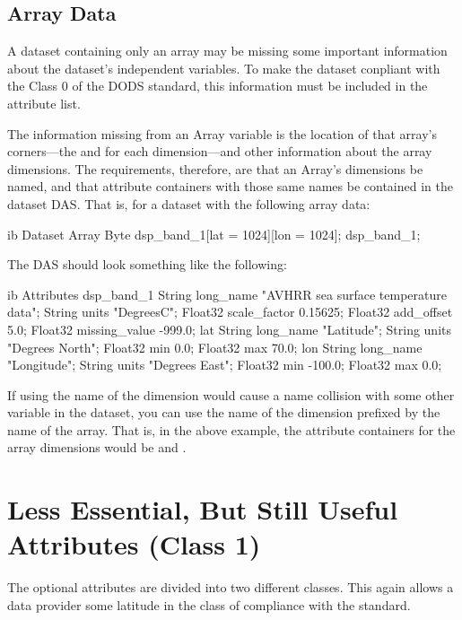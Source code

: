 \subsection{Array Data}

A dataset containing only an array may be missing some important
information about the dataset's independent variables.  To make the
dataset conpliant with the Class 0 of the DODS standard, this
information must be included in the attribute list.

The information missing from an Array variable is the location of that
array's corners---the  and  for each dimension---and
other information about the array dimensions.  The requirements,
therefore, are that an Array's dimensions be named, and that attribute
containers with those same names be contained in the dataset DAS.
That is, for a dataset with the following array data:

\begin{vcode}{ib}
Dataset {
    Array {
      Byte dsp_band_1[lat = 1024][lon = 1024];
    } dsp_band_1;
}
\end{vcode}

The DAS should look something like the following:

\begin{vcode}{ib}
Attributes {
  dsp_band_1 {
    String long_name "AVHRR sea surface temperature data";
    String units "DegreesC";
    Float32 scale_factor 0.15625;
    Float32 add_offset 5.0;
    Float32 missing_value -999.0;
  }
  lat {
    String long_name "Latitude";
    String units "Degrees North";
    Float32 min 0.0;
    Float32 max 70.0;
  }
  lon {
    String long_name "Longitude";
    String units "Degrees East";
    Float32 min -100.0;
    Float32 max 0.0;
  }
}
\end{vcode}

If using the name of the dimension would cause a name collision with
some other variable in the dataset, you can use the name of the
dimension prefixed by the name of the array.  That is, in the above
example, the attribute containers for the array dimensions would be
 and .
  

\section{Less Essential, But Still Useful Attributes (Class 1)}

The optional attributes are divided into two different classes.  This
again allows a data provider some latitude in the class of compliance
with the standard.

